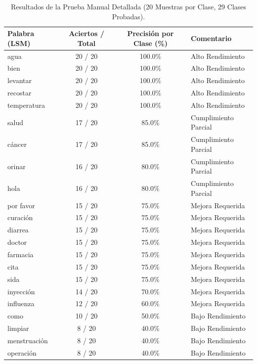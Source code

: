\begin{table}[H]
    \centering
    \caption{Resultados de la Prueba Manual Detallada (20 Muestras por Clase, 29 Clases Probadas).}
    \label{tab:detalle_pruebas_manuales_completa}
    \begin{tabular}{|l|c|c|l|}
        \hline
        \textbf{Palabra (LSM)} & \textbf{Aciertos / Total} & \textbf{Precisión por Clase (\%)} & \textbf{Comentario} \\
        \hline
        agua & 20 / 20 & 100.0\% & Alto Rendimiento \\
        bien & 20 / 20 & 100.0\% & Alto Rendimiento \\
        levantar & 20 / 20 & 100.0\% & Alto Rendimiento \\
        recostar & 20 / 20 & 100.0\% & Alto Rendimiento \\
        temperatura & 20 / 20 & 100.0\% & Alto Rendimiento \\
        \hline
        salud & 17 / 20 & 85.0\% & Cumplimiento Parcial \\
        cáncer & 17 / 20 & 85.0\% & Cumplimiento Parcial \\
        orinar & 16 / 20 & 80.0\% & Cumplimiento Parcial \\
        hola & 16 / 20 & 80.0\% & Cumplimiento Parcial \\
        \hline
        por favor & 15 / 20 & 75.0\% & Mejora Requerida \\
        curación & 15 / 20 & 75.0\% & Mejora Requerida \\
        diarrea & 15 / 20 & 75.0\% & Mejora Requerida \\
        doctor & 15 / 20 & 75.0\% & Mejora Requerida \\
        farmacia & 15 / 20 & 75.0\% & Mejora Requerida \\
        cita & 15 / 20 & 75.0\% & Mejora Requerida \\
        sida & 15 / 20 & 75.0\% & Mejora Requerida \\
        \hline
        inyección & 14 / 20 & 70.0\% & Mejora Requerida \\
        influenza & 12 / 20 & 60.0\% & Mejora Requerida \\
        como & 10 / 20 & 50.0\% & Bajo Rendimiento \\
        \hline
        limpiar & 8 / 20 & 40.0\% & Bajo Rendimiento \\
        menstruación & 8 / 20 & 40.0\% & Bajo Rendimiento \\
        operación & 8 / 20 & 40.0\% & Bajo Rendimiento \\

\end{tabular}
\end{table}
